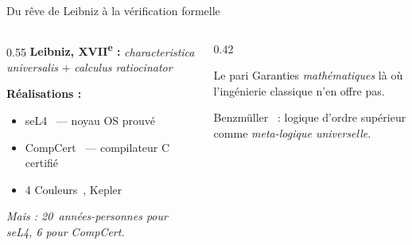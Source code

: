 \documentclass[aspectratio=169]{beamer}
\begin{document}
\begin{frame}{Du rêve de Leibniz à la vérification formelle}
  \begin{columns}
    \begin{column}{0.55\textwidth}
      \textbf{Leibniz, XVII\textsuperscript{e} :} \emph{characteristica universalis} + \emph{calculus ratiocinator}
      \medskip

      \textbf{Réalisations :}
      \begin{itemize}
        \item seL4~\cite{klein2009sel4} — noyau OS prouvé
        \item CompCert~\cite{leroy2009compcert} — compilateur C certifié
        \item 4 Couleurs~\cite{gonthier2008fourcolor}, Kepler~\cite{hales2017flyspeck}
      \end{itemize}
      \medskip
      \small\emph{Mais : 20~années-personnes pour seL4, 6 pour CompCert.}
    \end{column}
    \begin{column}{0.42\textwidth}
      \begin{block}{Le pari}
        Garanties \emph{mathématiques} là où l'ingénierie classique n'en offre pas.
      \end{block}
      \medskip
      \small
      Benzmüller~\cite{benzmullerUniversalReasoningRational2017} :
      logique d'ordre supérieur comme \emph{meta-logique universelle}.
    \end{column}
  \end{columns}
\end{frame}
\end{document}
